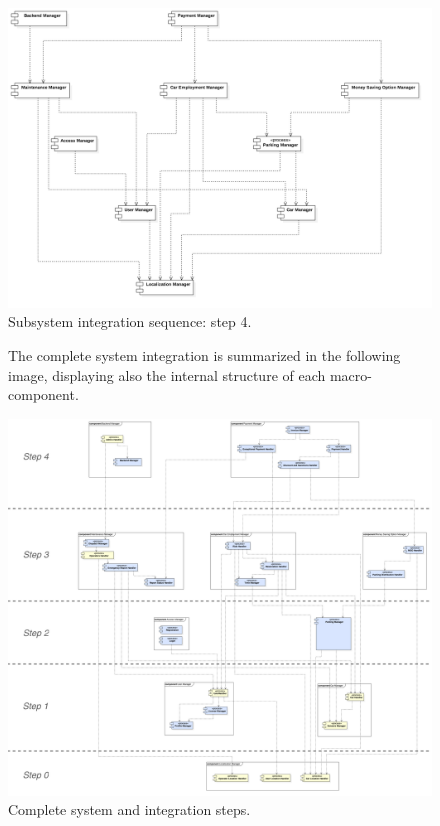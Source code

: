 		\begin{figure}[h]
			\par\bigskip
			\includegraphics[width=\textwidth,center]{img/integration_strategy/steps/high_level_components_lv4.png}
			\caption{Subsystem integration sequence: step 4.}
		\end{figure}
		\FloatBarrier

		\begin{figure}[h]
			The complete system integration is summarized in the following image, displaying also the internal structure of each macro-component.
			\par\bigskip
			\includegraphics[width=\textwidth,center]{img/integration_strategy/complete_unravelled-steps.png}
			\caption{Complete system and integration steps.}
		\end{figure}
		\FloatBarrier
